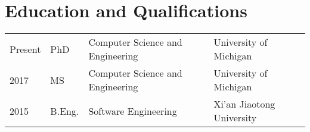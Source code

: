 \documentclass[a4paper,11pt]{article}
\begin{document}
\maketitle

\section{Education and Qualifications}

\begin{tabular}{llll}
    Present        & PhD  & Computer Science and Engineering & University of Michigan \\
    2017           & MS   & Computer Science and Engineering & University of Michigan \\
    2015           & B.Eng. & Software Engineering & Xi'an Jiaotong University
\end{tabular}
\end{document}
